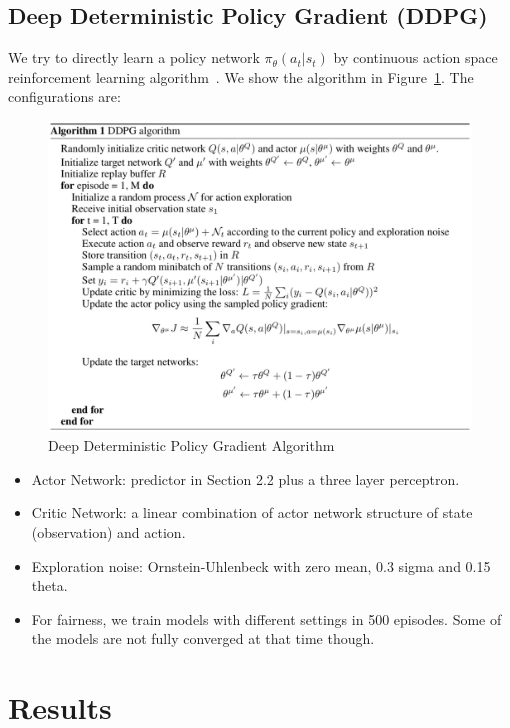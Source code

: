 \documentclass[a4paper, 10pt]{article}
\begin{document}
\begin{spacing}{1.2}
    \subsection{Deep Deterministic Policy Gradient (DDPG)}
    We try to directly learn a policy network $\pi_{\theta}(a_t|s_t)$ by continuous action space reinforcement learning algorithm~\cite{DBLP:journals/corr/LillicrapHPHETS15}. We show the algorithm in Figure~\ref{fig:ddpg_algorithm}. The configurations are:
    \begin{figure}
      \centering
      \includegraphics[scale=0.5]{ddpg}
      \caption{Deep Deterministic Policy Gradient Algorithm\cite{DBLP:journals/corr/LillicrapHPHETS15}}
      \label{fig:ddpg_algorithm}
    \end{figure}
    \begin{itemize}
      \item Actor Network: predictor in Section 2.2 plus a three layer perceptron.
      \item Critic Network: a linear combination of actor network structure of state (observation) and action.
      \item Exploration noise: Ornstein-Uhlenbeck with zero mean, 0.3 sigma and 0.15 theta.
      \item For fairness, we train models with different settings in 500 episodes. Some of the models are not fully converged at that time though. 
    \end{itemize}
    
    \section{Results}

\end{spacing}
\end{document}
